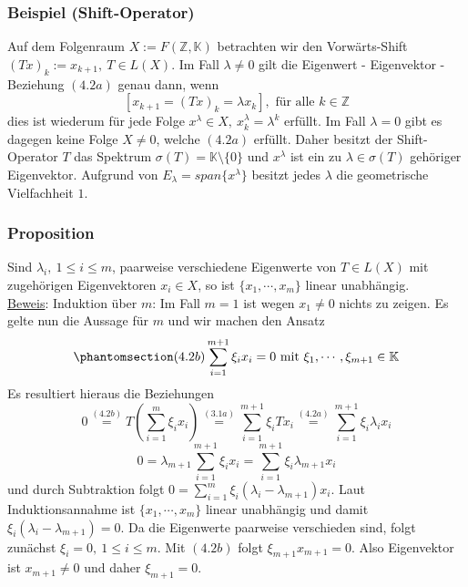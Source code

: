 \subsubsection{Beispiel (Shift-Operator)}
Auf dem Folgenraum $X:=F(\mathbb{Z},\mathbb{K})$ betrachten wir den Vorwärts-Shift $(Tx)_k :=x_{k+1},\ T\in L(X)$.  Im Fall $\lambda \not= 0$ gilt die Eigenwert - Eigenvektor - Beziehung \hyperref[4.2a]{$(4.2a)$} genau dann, wenn
\[[x_{k+1}=(Tx)_k=\lambda x_k],\text{ für alle } k\in\mathbb{Z}\]
dies ist wiederum für jede Folge $x^\lambda \in X,\ x_k^\lambda =\lambda ^k$ erfüllt.  Im Fall $\lambda = 0$ gibt es dagegen keine Folge $X\not= 0$, welche \hyperref[4.2a]{$(4.2a)$} erfüllt.  Daher besitzt der Shift-Operator $T$ das Spektrum $\sigma (T)=\mathbb{K}\setminus \{0\}$ und $x^\lambda$ ist ein zu $\lambda \in \sigma (T)$ gehöriger Eigenvektor.  Aufgrund von $E_\lambda =span\{x^\lambda\}$ besitzt jedes $\lambda$ die geometrische Vielfachheit $1$.
\subsubsection{Proposition}
\label{4.2.5}
Sind $\lambda _i,\ 1\leq i\leq m$, paarweise verschiedene Eigenwerte von $T\in L(X)$ mit zugehörigen Eigenvektoren $x_i\in X$, so ist $\{x_1,\cdots ,x_m\}$ linear unabhängig.\\
\underline{Beweis}: Induktion über $m$: Im Fall $m=1$ ist wegen $x_1\not=0$ nichts zu zeigen.  Es gelte nun die Aussage für $m$ und wir machen den Ansatz 
\[\phantomsection\label{4.2b}(4.2b)\sum _{i=1}^{m+1}\xi _i x_i=0\text{ mit } \xi _1,\cdots ,\xi _{m+1}\in\mathbb{K}\]
Es resultiert hieraus die Beziehungen
\[0\stackrel{\hyperref[4.2b]{(4.2b)}}{=}T(\sum _{i=1}^m \xi _i x_i)\stackrel{\hyperref[3.1a]{(3.1a)}}{=}\sum _{i=1}^{m+1}\xi _i Tx_i\stackrel{\hyperref[4.2a]{(4.2a)}}{=}\sum _{i=1}^{m+1}\xi _i\lambda _i x_i\]
\[0=\lambda _{m+1}\sum _{i=1}^{m+1}\xi _i x_i = \sum _{i=1}^{m+1} \xi _i \lambda _{m+1} x_i\]
und durch Subtraktion folgt $0=\sum _{i=1}^m \xi _i (\lambda _i-\lambda _{m+1}) x_i$.  Laut Induktionsannahme ist $\{x_1,\cdots ,x_m\}$ linear unabhängig und damit $\xi _i (\lambda _i -\lambda _{m+1})=0$.  Da die Eigenwerte paarweise verschieden sind, folgt zunächst $\xi _i=0,\ 1\leq i\leq m$.  Mit \hyperref[4.2b]{$(4.2b)$} folgt $\xi _{m+1} x_{m+1}=0$.  Also Eigenvektor ist $x_{m+1}\not=0$ und daher $\xi _{m+1}=0$.
